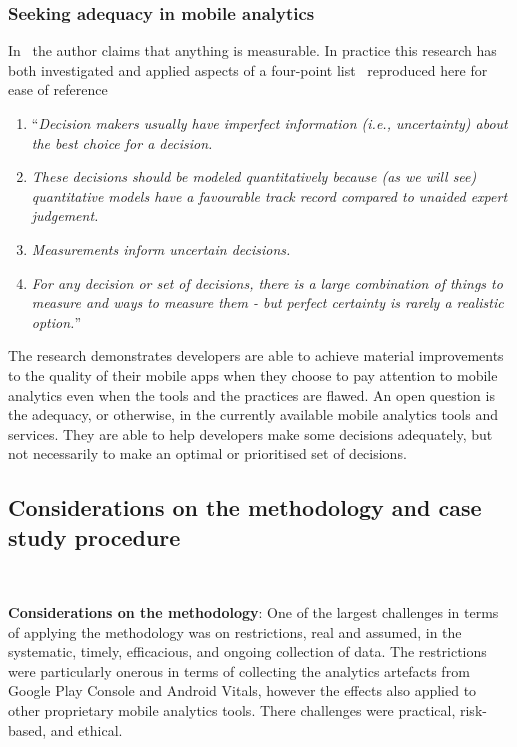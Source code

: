 \subsubsection{Seeking adequacy in mobile analytics}
In~ the author claims that anything is measurable. In practice this research has both investigated and applied aspects of a four-point list~ reproduced here for ease of reference %

\begin{enumerate}
    \itemsep0em
    \item ``\textit{Decision makers usually have imperfect information (i.e., uncertainty) about the best choice for a decision.}
    \item \textit{These decisions should be modeled quantitatively because (as we will see) quantitative models have a favourable track record compared to unaided expert judgement.}
    \item \textit{Measurements inform uncertain decisions.}
    \item \textit{For any decision or set of decisions, there is a large combination of things to measure and ways to measure them - but perfect certainty is rarely a realistic option.}''
\end{enumerate}

The research demonstrates developers are able to achieve material improvements to the quality of their mobile apps when they choose to pay attention to mobile analytics even when the tools and the practices are flawed. An open question is the adequacy, or otherwise, in the currently available mobile analytics tools and services. They are able to help developers make some decisions adequately, but not necessarily to make an optimal or prioritised set of decisions. 


\subsection{Considerations on the methodology and case study procedure}~\label{discussion-on-methodology-and-case-study-procedure}


\textbf{Considerations on the methodology}: 
One of the largest challenges in terms of applying the methodology was on restrictions, real and assumed, in the systematic, timely, efficacious, and ongoing collection of data. The restrictions were particularly onerous in terms of collecting the analytics artefacts from Google Play Console and Android Vitals, however the effects also applied to other proprietary mobile analytics tools. There challenges were practical, risk-based, and ethical. 


